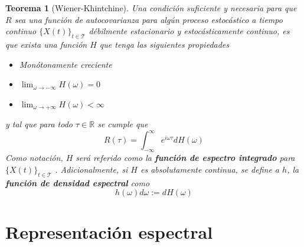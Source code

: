 \documentclass[12pt,letterpaper]{book}
\newtheorem{teorema}{Teorema}[chapter]
\newcommand{\R}{\mathbb{R}}
\newcommand{\intR}{\int_{-\infty}^{\infty}}
\newcommand{\E}[1]{\mathrm{E}\left[ #1 \right]}
\newcommand{\abso}[1]{\left| #1 \right|}
\newcommand{\xt}{$\{X(t)\}_{t\in \mathcal{T}}$ }
\begin{document}
\begin{teorema}[Wiener-Khintchine]
Una condición suficiente y necesaria para que $R$ sea una función de autocovarianza para algún proceso estocástico a tiempo continuo \xt débilmente estacionario y estocásticamente continuo, es que exista una función $H$ que tenga las siguientes propiedades
\begin{itemize}
\item Monótonamente creciente
\item $\lim_{\omega\rightarrow -\infty} H(\omega) = 0$
\item $\lim_{\omega\rightarrow +\infty} H(\omega) < \infty$
\end{itemize}
y tal que para todo $\tau \in \R$ se cumple que
\begin{equation*}
R(\tau) = \intR e^{i \omega \tau} dH(\omega)
\end{equation*}
Como notación, $H$ será referido como la \textbf{función de espectro integrado} para \xt.
%
Adicionalmente, si $H$ es absolutamente continua, se define a $h$, la \textbf{función de densidad espectral} como
\begin{equation}
h(\omega) d\omega := dH(\omega)
\end{equation}
\label{t_wienerkhinchin}
\end{teorema}



\section{Representación espectral}


\end{document}
